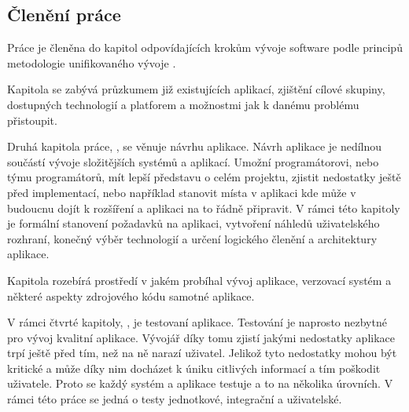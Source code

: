 \begin{introduction}
    \section{Členění práce}
    Práce je členěna do kapitol odpovídajících krokům vývoje software podle principů metodologie unifikovaného vývoje \cite[s.~51-68]{arlow_2007_uml}.

    Kapitola  se zabývá průzkumem již existujících aplikací, zjištění cílové skupiny, dostupných technologií a platforem a možnostmi jak k danému problému přistoupit.

    Druhá kapitola práce, , se věnuje návrhu aplikace. Návrh aplikace je nedílnou součástí vývoje složitějších systémů a aplikací. Umožní programátorovi, nebo týmu programátorů, mít lepší představu o celém projektu, zjistit nedostatky ještě před implementací, nebo například stanovit místa v aplikaci kde může v budoucnu dojít k rozšíření a aplikaci na to řádně připravit. V rámci této kapitoly je formální stanovení požadavků na aplikaci, vytvoření náhledů uživatelského rozhraní, konečný výběr technologií a určení logického členění a architektury aplikace.

    Kapitola  rozebírá prostředí v jakém probíhal vývoj aplikace, verzovací systém a některé aspekty zdrojového kódu samotné aplikace.

    V rámci čtvrté kapitoly, , je testovaní aplikace. Testování je naprosto nezbytné pro vývoj kvalitní aplikace. Vývojář díky tomu zjistí jakými nedostatky aplikace trpí ještě před tím, než na ně narazí uživatel. Jelikož tyto nedostatky mohou být kritické a může díky nim docházet k úniku citlivých informací a tím poškodit uživatele. Proto se každý systém a aplikace testuje a to na několika úrovních. V rámci této práce se jedná o testy jednotkové, integrační a uživatelské.
\end{introduction}